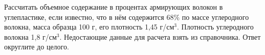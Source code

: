 
Рассчитать объемное содержание в процентах
армирующих волокон в углепластике, если известно, что в нём содержится $68\%$ по
массе углеродного волокна, масса образца 100 г, его плотность 1,45 г/см$^3$.
Плотность углеродного волокна 1,8 г/см$^3$. Недостающие данные для
расчета взять из справочника. Ответ округлите до целого.